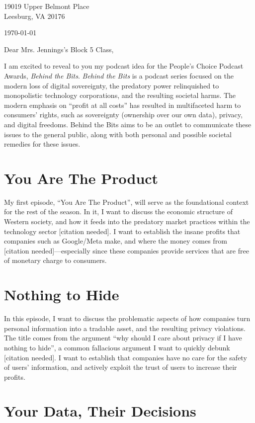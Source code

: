 \documentclass[12pt]{article}
\begin{document}
\begin{flushright}
  19019 Upper Belmont Place \\ Leesburg, VA 20176
  
  \medskip \today
\end{flushright}

\medskip
Dear Mrs. Jennings’s Block 5 Class,

\medskip
I am excited to reveal to you my podcast idea for the People’s Choice Podcast
Awards, \emph{Behind the Bits}. \emph{Behind the Bits} is a podcast series focused on the
modern loss of digital sovereignty, the predatory power relinquished to
monopolistic technology corporations, and the resulting societal harms. The
modern emphasis on “profit at all costs” has resulted in multifaceted harm to
consumers’ rights, such as sovereignty (ownership over our own data), privacy,
and digital freedoms. Behind the Bits aims to be an outlet to communicate these
issues to the general public, along with both personal and possible societal
remedies for these issues.

\section{You Are The Product}
My first episode, “You Are The Product”, will serve as the foundational context
for the rest of the season. In it, I want to discuss the economic structure of
Western society, and how it feeds into the predatory market practices within the
technology sector [citation needed]. I want to establish the insane profits that
companies such as Google/Meta make, and where the money comes from [citation
needed]—especially since these companies provide services that are free of
monetary charge to consumers.

\section{Nothing to Hide}
In this episode, I want to discuss the problematic aspects of how companies turn personal information into a tradable asset, and the resulting privacy violations. The title comes from the argument “why should I care about privacy if I have nothing to hide”, a common fallacious argument I want to quickly debunk [citation needed]. I want to establish that companies have no care for the safety of users’ information, and actively exploit the trust of users to increase their profits.

\section{Your Data, Their Decisions}
\end{document}
